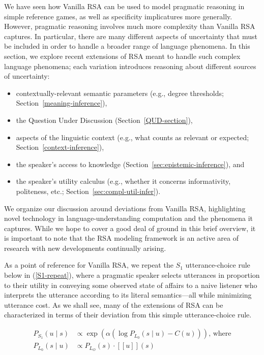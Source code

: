 \documentclass{sp}
\newcommand{\sem}[1]{\ensuremath{[\![#1]\!]}}
\begin{document}
We have seen how Vanilla RSA can be used to model pragmatic reasoning in simple reference games, as well as specificity implicatures more generally. However, pragmatic reasoning involves much more complexity than Vanilla RSA captures. In particular, there are many different aspects of uncertainty that must be included in order to handle a broader range of language phenomena. In this section, we explore recent extensions of RSA meant to handle such complex language phenomena; each variation introduces reasoning about different sources of uncertainty:
\begin{itemize}
  \item contextually-relevant semantic parameters (e.g., degree thresholds; Section~\ref{meaning-inference}),
  \item the Question Under Discussion (Section~\ref{QUD-section}),
  \item aspects of the linguistic context (e.g., what counts as relevant or expected; Section~\ref{context-inference}),
  \item the speaker's access to knowledge (Section~\ref{sec:epistemic-inference}), and
  \item the speaker's utility calculus (e.g., whether it concerns informativity, politeness, etc.; Section~\ref{sec:compl-util-infer}).
\end{itemize}
We organize our discussion around deviations from Vanilla RSA, highlighting novel technology in language-understanding computation and the phenomena it captures. While we hope to cover a good deal of ground in this brief overview, it is important to note that the RSA modeling framework is an active area of research with new developments continually arising.

As a point of reference for Vanilla RSA, we repeat the $S_1$ utterance-choice rule below in (\ref{S1-repeat}), where a pragmatic speaker selects utterances in proportion to their utility in conveying some observed state of affairs to a naive listener who interprets the utterance according to its literal semantics---all while minimizing utterance cost. As we shall see, many of the extensions of RSA can be characterized in terms of their deviation from this simple utterance-choice rule.

\begin{align} \label{S1-repeat}
  P_{S_1}(u\mid s) & \propto \exp (\alpha (\log P_{L_0}(s \mid u) - C(u))) \text{, where} \\
  P_{L_0}(s \mid u) & \propto P_{L_O}(s)  \cdot \sem{u}(s) \nonumber
\end{align}
\end{document}
